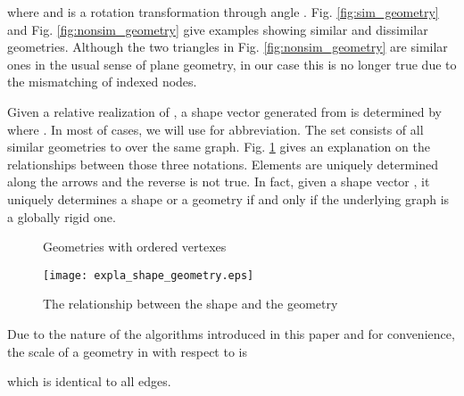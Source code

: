 \documentclass[times]{rncauth}
\begin{document}
where  and  is a rotation transformation
through angle . Fig. \ref{fig:sim_geometry} and Fig.
\ref{fig:nonsim_geometry} give examples showing similar and
dissimilar geometries. Although the two triangles in Fig.
\ref{fig:nonsim_geometry} are similar ones in the usual sense of
plane geometry, in our case this is no longer true due to the mismatching of indexed nodes.

Given a relative realization  of , a shape vector
 generated from  is determined by
 where . In most of cases, we will
use  for abbreviation. The set  consists of all
similar geometries to  over the same graph. Fig.
\ref{fig:expla_shape_geome} gives an explanation on the
relationships between those three notations. Elements are uniquely
determined along the arrows and the reverse is not true. In fact,
given a shape vector , it uniquely determines a shape or a
geometry  if and only if the underlying graph is a
globally rigid one\cite{Anderson08rigidMagazine}.

\begin{figure}
\caption{Geometries with ordered vertexes}
\end{figure}

\begin{figure}
\centering
  \texttt{[image: expla\_shape\_geometry.eps]}\\
  \caption{The relationship between the shape and the geometry}\label{fig:expla_shape_geome}
\end{figure}



Due to the nature of the algorithms introduced in this paper and for
convenience, the scale of a geometry in  with
respect to  is

which is  identical to all edges.
\end{document}
